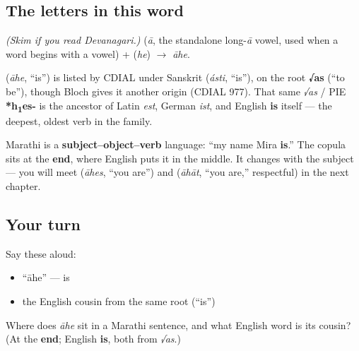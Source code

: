 \subsection*{The letters in this word}
\emph{(Skim if you read Devanagari.)} \textbf{} (\emph{ā}, the standalone long-\emph{ā} vowel, used when a word begins with a vowel) + \textbf{} (\emph{he}) $\to$ \textbf{} \emph{āhe}.

\begin{cousinweb}
\textbf{} (\emph{āhe}, \textquotedblleft{}is\textquotedblright{}) is listed by CDIAL under Sanskrit \textbf{} (\emph{ásti}, \textquotedblleft{}is\textquotedblright{}), on the root \textbf{√as} (\textquotedblleft{}to be\textquotedblright{}), though Bloch gives it another origin (CDIAL 977). That same \emph{√as} / PIE \textbf{*h\textsubscript{1}es-} is the ancestor of Latin \emph{est}, German \emph{ist}, and English \textbf{is} itself — the deepest, oldest verb in the family.
\end{cousinweb}

\begin{grammarlens}[title={Grammar Lens: the verb goes last}]
Marathi is a \textbf{subject–object–verb} language: \textquotedblleft{}my name Mira \textbf{is}.\textquotedblright{} The copula \textbf{} sits at the \textbf{end}, where English puts it in the middle. It changes with the subject — you will meet \textbf{} (\emph{āhes}, \textquotedblleft{}you are\textquotedblright{}) and \textbf{} (\emph{āhāt}, \textquotedblleft{}you are,\textquotedblright{} respectful) in the next chapter.
\end{grammarlens}

\subsection*{Your turn}
Say these aloud:

\begin{itemize}
\raggedright
  \item \textquotedblleft{}āhe\textquotedblright{} — is
  \item the English cousin from the same root (\textquotedblleft{}is\textquotedblright{})
\end{itemize}

\begin{tcolorbox}[breakable,colback=teal!4,colframe=teal!35!black,title={Before you move on}]
Where does \emph{āhe} sit in a Marathi sentence, and what English word is its cousin? (At the \textbf{end}; English \textbf{is}, both from \emph{√as}.)
\end{tcolorbox}
